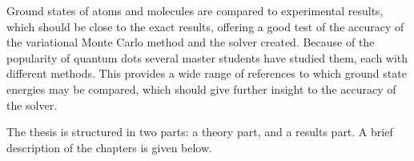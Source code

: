 Ground states of atoms and molecules are compared to experimental
results, which should be close to the exact results, offering a good
test of the accuracy of the variational Monte Carlo method and the
solver created. Because of the popularity of quantum dots several
master students have studied them, each with different methods. This
provides a wide range of references to which ground state energies may
be compared, which should give further insight to the accuracy of the
solver.

The thesis is structured in two parts: a theory part, and a results part. A brief description of the chapters is given below.
